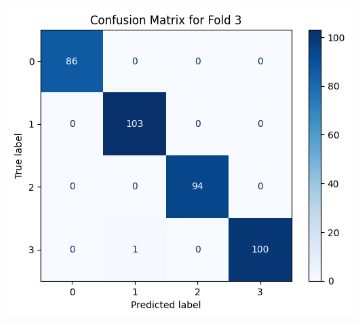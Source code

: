 \documentclass{article}
\begin{document}
\begin{figure}[H]
\begin{subfigure}[b]{0.32\textwidth}
        \label{fig:image2}
    \end{subfigure}
    \hfill
    \begin{subfigure}[b]{0.33\textwidth}
        \centering
        \includegraphics[width=\textwidth]{img/Q2/f3.png}
        \label{fig:image3}
    \end{subfigure}
    
    \vspace{0.5cm}
    

\end{figure}
\end{document}
